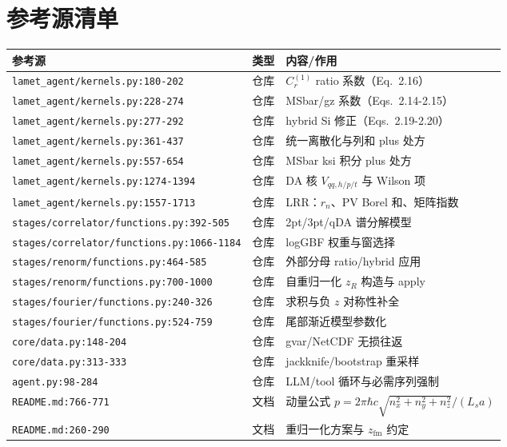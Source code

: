 \documentclass[UTF8]{ctexart}
\begin{document}
\section{参考源清单}
\begin{xltabular}{\textwidth}{llX}
\toprule
\textcolor{evidence}{参考源} & 类型 & 内容/作用 \\
\midrule
\endhead
\texttt{\nolinkurl{lamet_agent/kernels.py:180-202}} & 仓库 & $C_r^{(1)}$ ratio 系数（Eq.~2.16） \\
\texttt{\nolinkurl{lamet_agent/kernels.py:228-274}} & 仓库 & MSbar/gz 系数（Eqs.~2.14-2.15） \\
\texttt{\nolinkurl{lamet_agent/kernels.py:277-292}} & 仓库 & hybrid Si 修正（Eqs.~2.19-2.20） \\
\texttt{\nolinkurl{lamet_agent/kernels.py:361-437}} & 仓库 & 统一离散化与列和 plus 处方 \\
\texttt{\nolinkurl{lamet_agent/kernels.py:557-654}} & 仓库 & MSbar ksi 积分 plus 处方 \\
\texttt{\nolinkurl{lamet_agent/kernels.py:1274-1394}} & 仓库 & DA 核 $V_{qq,h/p/t}$ 与 Wilson 项 \\
\texttt{\nolinkurl{lamet_agent/kernels.py:1557-1713}} & 仓库 & LRR：$r_n$、PV Borel 和、矩阵指数 \\
\texttt{\nolinkurl{stages/correlator/functions.py:392-505}} & 仓库 & 2pt/3pt/qDA 谱分解模型 \\
\texttt{\nolinkurl{stages/correlator/functions.py:1066-1184}} & 仓库 & logGBF 权重与窗选择 \\
\texttt{\nolinkurl{stages/renorm/functions.py:464-585}} & 仓库 & 外部分母 ratio/hybrid 应用 \\
\texttt{\nolinkurl{stages/renorm/functions.py:700-1000}} & 仓库 & 自重归一化 $z_R$ 构造与 apply \\
\texttt{\nolinkurl{stages/fourier/functions.py:240-326}} & 仓库 & 求积与负 $z$ 对称性补全 \\
\texttt{\nolinkurl{stages/fourier/functions.py:524-759}} & 仓库 & 尾部渐近模型参数化 \\
\texttt{\nolinkurl{core/data.py:148-204}} & 仓库 & gvar/NetCDF 无损往返 \\
\texttt{\nolinkurl{core/data.py:313-333}} & 仓库 & jackknife/bootstrap 重采样 \\
\texttt{\nolinkurl{agent.py:98-284}} & 仓库 & LLM/tool 循环与必需序列强制 \\
\texttt{\nolinkurl{README.md:766-771}} & 文档 & 动量公式 $p=2\pi\hbar c\sqrt{n_x^2+n_y^2+n_z^2}/(L_s a)$ \\
\texttt{\nolinkurl{README.md:260-290}} & 文档 & 重归一化方案与 $z_{\mathrm{fm}}$ 约定 \\
\bottomrule
\end{xltabular}
\end{document}
